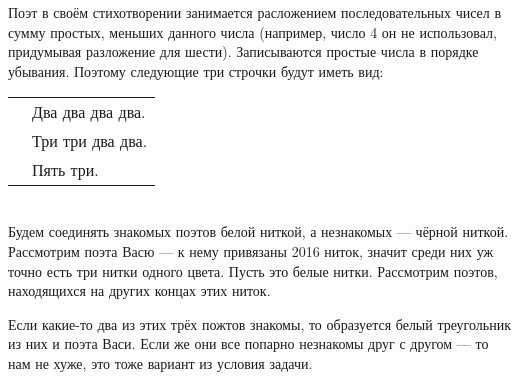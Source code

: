\begin{itemize}

\itA
Поэт в своём стихотворении занимается расложением последовательных чисел в сумму простых, меньших данного числа (например, число 4 он не использовал, придумывая разложение для шести). Записываются простые числа в порядке убывания. Поэтому следующие три строчки будут иметь вид: \\
\begin{tabular}{p{1.7cm}l}
& Два два два два. \\
& Три три два два. \\
& Пять три.
\end{tabular}


\itB $\phantom{x}$
\vspace{-0.5cm}
\begin{center}\end{center}
\vspace{0.2cm}

\itC Будем соединять знакомых поэтов белой ниткой, а незнакомых — чёрной ниткой. Рассмотрим поэта Васю — к нему привязаны 2016 ниток, значит среди них уж точно есть три нитки одного цвета. Пусть это белые нитки. Рассмотрим поэтов, находящихся на других концах этих ниток.

Если какие-то два из этих трёх пожтов знакомы, то образуется белый треугольник из них и поэта Васи. Если же они все попарно незнакомы друг с другом — то нам не хуже, это тоже вариант из условия задачи.
\end{itemize}
